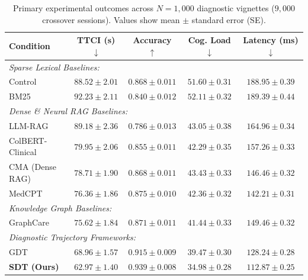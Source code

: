 \documentclass[12pt]{article}
\begin{document}
\begin{table}[h!]
  \centering
  \caption{Primary experimental outcomes across $N=1{,}000$ diagnostic vignettes ($9{,}000$ crossover sessions). Values show mean $\pm$ standard error (SE).}
  \label{tab:primary_results}
  \small
  \begin{tabular}{@{}lcccc@{}}
    \toprule
    \textbf{Condition} & \textbf{TTCI (s)} $\downarrow$ & \textbf{Accuracy} $\uparrow$ & \textbf{Cog. Load} $\downarrow$ & \textbf{Latency (ms)} $\downarrow$ \\
    \midrule
    \multicolumn{5}{l}{\textit{Sparse Lexical Baselines:}} \\
    Control  & $88.52 \pm 2.01$ & $0.868 \pm 0.011$ & $51.60 \pm 0.31$ & $188.95 \pm 0.39$ \\
    BM25     & $92.23 \pm 2.11$ & $0.840 \pm 0.012$ & $52.11 \pm 0.32$ & $189.39 \pm 0.44$ \\
    \midrule
    \multicolumn{5}{l}{\textit{Dense \& Neural RAG Baselines:}} \\
    LLM-RAG \cite{eickhoff2024ehrrag}  & $89.18 \pm 2.36$ & $0.786 \pm 0.013$ & $43.05 \pm 0.38$ & $164.96 \pm 0.34$ \\
    ColBERT-Clinical \cite{santhanam2022colbertv2} & $79.95 \pm 2.06$ & $0.855 \pm 0.011$ & $42.29 \pm 0.35$ & $157.26 \pm 0.33$ \\
    CMA (Dense RAG) \cite{lewis2020retrieval} & $78.71 \pm 1.90$ & $0.868 \pm 0.011$ & $43.43 \pm 0.33$ & $146.46 \pm 0.32$ \\
    MedCPT \cite{jin2023medcpt}       & $76.36 \pm 1.86$ & $0.875 \pm 0.010$ & $42.36 \pm 0.32$ & $142.21 \pm 0.31$ \\
    \midrule
    \multicolumn{5}{l}{\textit{Knowledge Graph Baselines:}} \\
    GraphCare \cite{jiang2024graphcare} & $75.62 \pm 1.84$ & $0.871 \pm 0.011$ & $41.44 \pm 0.33$ & $149.46 \pm 0.32$ \\
    \midrule
    \multicolumn{5}{l}{\textit{Diagnostic Trajectory Frameworks:}} \\
    GDT      & $68.96 \pm 1.57$ & $0.915 \pm 0.009$ & $39.47 \pm 0.30$ & $128.24 \pm 0.28$ \\
    \textbf{SDT (Ours)} & $\mathbf{62.97 \pm 1.40}$ & $\mathbf{0.939 \pm 0.008}$ & $\mathbf{34.98 \pm 0.28}$ & $\mathbf{112.87 \pm 0.25}$ \\
    \bottomrule
  \end{tabular}
\end{table}

\vspace{1cm}
\end{document}
